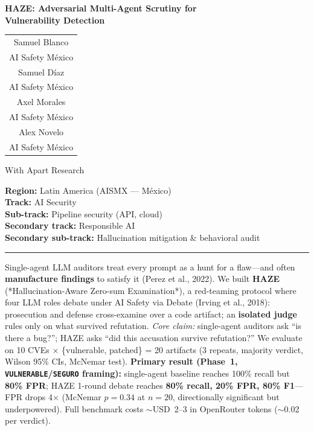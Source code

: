 \documentclass[10pt]{article}
\begin{document}
\begin{center}
{\Large\bfseries HAZE: Adversarial Multi-Agent Scrutiny for\\
Vulnerability Detection\par}
\vspace{0.8em}
\begin{tabular}{@{}c@{}}
Samuel Blanco \\
AI Safety México \\[0.4em]
Samuel Díaz \\
AI Safety México \\[0.4em]
Axel Morales \\
AI Safety México \\[0.4em]
Alex Novelo \\
AI Safety México \\
\end{tabular}

\vspace{0.6em}
{\small With Apart Research}

\vspace{0.4em}
{\small
\textbf{Region:} Latin America (AISMX --- México)\\
\textbf{Track:} AI Security\\
\textbf{Sub-track:} Pipeline security (API, cloud)\\
\textbf{Secondary track:} Responsible AI\\
\textbf{Secondary sub-track:} Hallucination mitigation \& behavioral audit
}
\end{center}

\vspace{0.3em}
\noindent\rule{\textwidth}{0.4pt}
\vspace{0.3em}

\par
\vspace{0.2em}
Single-agent LLM auditors treat every prompt as a hunt for a flaw---and often
\textbf{manufacture findings} to satisfy it (Perez et al., 2022). We built
\textbf{HAZE} (*Hallucination-Aware Zero-sum Examination*), a red-teaming protocol
where four LLM roles debate under AI Safety via Debate (Irving et al., 2018):
prosecution and defense cross-examine over a code artifact; an \textbf{isolated
judge} rules only on what survived refutation. \textit{Core claim:} single-agent
auditors ask ``is there a bug?''; HAZE asks ``did this accusation survive
refutation?'' We evaluate on 10 CVEs $\times$ \{vulnerable, patched\} = 20
artifacts (3 repeats, majority verdict, Wilson 95\% CIs, McNemar test).
\textbf{Primary result (Phase~1, \texttt{VULNERABLE}/\texttt{SEGURO} framing):} single-agent
baseline reaches 100\% recall but \textbf{80\% FPR}; HAZE 1-round debate reaches
\textbf{80\% recall, 20\% FPR, 80\% F1}---FPR drops 4$\times$ (McNemar $p{=}0.34$ at
$n{=}20$, directionally significant but underpowered). Full benchmark costs
${\sim}$USD~2--3 in OpenRouter tokens (${\sim}$0.02 per verdict).
\end{document}
